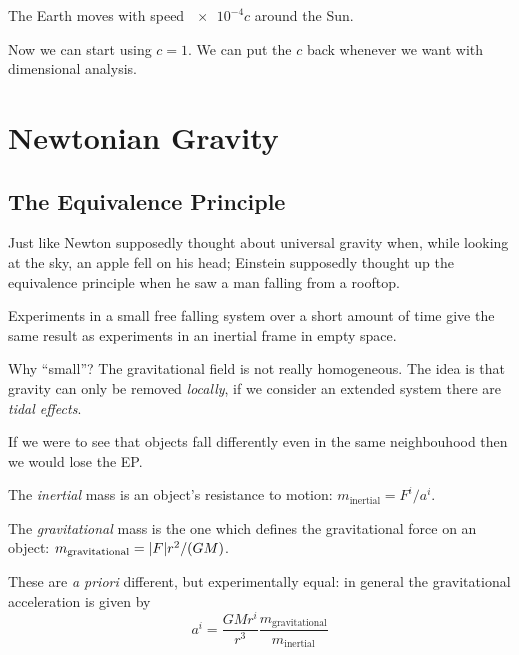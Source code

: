 \documentclass[main.tex]{subfiles}
\begin{document}
The Earth moves with speed \(\num{e-4}  c\) around the Sun.


Now we can start using \(c=1\). We can put the \(c\) back whenever we want with dimensional analysis.

\section{Newtonian Gravity}

\subsection{The Equivalence Principle}

Just like Newton supposedly thought about universal gravity when, while looking at the sky, an apple fell on his head; Einstein supposedly thought up the equivalence principle when he saw a man falling from a rooftop.

\begin{proposition}
Experiments in a small free falling system over a short amount of time give the same result as experiments in an inertial frame in empty space.
\end{proposition}

Why ``small''? The gravitational field is not really homogeneous.
The idea is that gravity can only be removed \emph{locally}, if we consider an extended system there are \emph{tidal effects}.

If we were to see that objects fall differently even in the same neighbouhood then we would lose the EP.

\begin{definition}
The \emph{inertial} mass is an object's resistance to motion: \(m _{\text{inertial}} = F^{i}/ a^{i}\).
\end{definition}

\begin{definition}
The \emph{gravitational} mass is the one which defines the gravitational force on an object: \(m _{\text{gravitational}} = \abs{F} r^2 / (G M)\).
\end{definition}

These are \emph{a priori} different, but experimentally equal: in general the gravitational acceleration is given by
\begin{equation}
a^{i} = \frac{GM r^{i} }{r^3} \frac{m _{\text{gravitational}}}{m _{\text{inertial}}}  
\end{equation}
\end{document}
